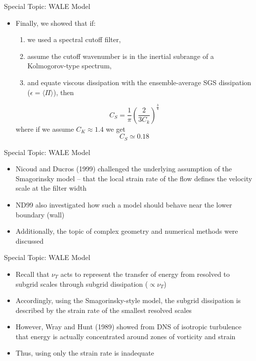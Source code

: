 \begin{frame}{Special Topic: WALE Model}
\begin{itemize}
	\item Finally, we showed that if: 
	\begin{enumerate}
		\item we used a spectral cutoff filter,
		\item assume the cutoff wavenumber is in the inertial subrange of a Kolmogorov-type spectrum,
		\item and equate viscous dissipation with the ensemble-average SGS dissipation ($\epsilon = \langle \Pi \rangle$), then
	\end{enumerate}
	$$C_S = \frac{1}{\pi}\left(\frac{2}{3C_k}\right)^{\frac{3}{4}}$$
	where if we assume $C_K \approx 1.4$ we get $$\boxed{C_S \simeq 0.18}$$
\end{itemize}
\end{frame}
\begin{frame}{Special Topic: WALE Model}
\begin{itemize}
	\item Nicoud and Ducros (1999) challenged the underlying assumption of the Smagorinsky model -- that the local strain rate of the flow defines the velocity scale at the filter width
	\item ND99 also investigated how such a model should behave near the lower boundary (wall)
	\item Additionally, the topic of complex geometry and numerical methods were discussed 
\end{itemize}
\end{frame}
\begin{frame}{Special Topic: WALE Model}
\begin{itemize}
	\item Recall that $\nu_T$ acts to represent the transfer of energy from resolved to subgrid scales through subgrid dissipation ($\propto \nu_T$)
	\item Accordingly, using the Smagorinsky-style model, the subgrid dissipation is described by the strain rate of the smallest resolved scales
	\item However, Wray and Hunt (1989) showed from DNS of isotropic turbulence that energy is actually concentrated around zones of vorticity and strain
	\item Thus, using only the strain rate is inadequate
\end{itemize}
\end{frame}
